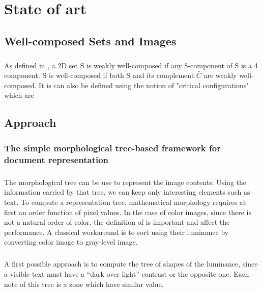 \documentclass[12pt,a4paper]{report}
\author{HUYNH Le Duy}
\begin{document}
\tableofcontents

\chapter{State of art}
\section{Well-composed Sets and Images}
\paragraph{}
As defined in \cite{Latecki95}, a 2D set S is weakly well-composed if any 8-component of S is a 4 component. S is well-composed if both S and its complement $\bar{C}$ are weakly well-composed. It is can also be defined using the notion of "critical configurations" which are 


\section{Approach}
\subsection{The simple morphological tree-based framework for document representation}
\paragraph{}
The morphological tree can be use to represent the image contents. Using the information carried by that tree, we can keep only interesting elements such as text. To compute a representation tree, mathematical morphology requires at first an order function of pixel values. In the case of color images, since there is not a natural order of color, the definition of is important and affect the performance. A classical workaround is to sort using their luminance by converting color image to gray-level image. 
\paragraph{}
A first possible approach is to compute the tree of shapes of the luminance, since a visible text must have a “dark over light” contrast or the opposite one. Each note of this tree is a zone which have similar value.
\end{document}
